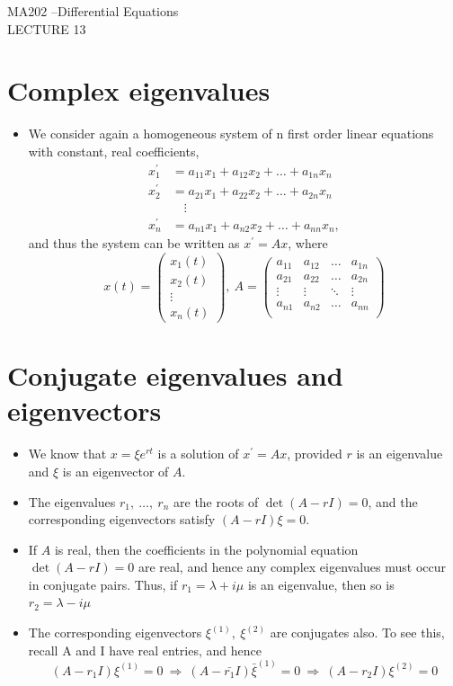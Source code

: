 \documentclass[11pt,a4paper]{article}
\begin{document}
	\begin{center}
		\vspace*{8cm}
		\Huge MA202 –Differential Equations\\
		\LARGE LECTURE 13
  \end{center}
  \newpage
	\section*{Complex eigenvalues}
	\begin{itemize}
		\item We consider again a homogeneous system of n first order linear equations with constant, real coefficients,
		\begin{align*}
			x_1^\prime &= a_{11}x_1 + a_{12}x_2 + \ldots + a_{1n}x_n\\
			x_2^\prime &= a_{21}x_1 + a_{22}x_2 + \ldots + a_{2n}x_n\\
			&\quad \vdots\\
			x_n^\prime &= a_{n1}x_1 + a_{n2}x_2 + \ldots + a_{nn}x_n,
		\end{align*}
		and thus the system can be written as $x^\prime = Ax$, where
		$$
		x(t) =
		\begin{pmatrix}
			x_1(t)\\
			x_2(t)\\
			\vdots\\
			x_n(t)
		\end{pmatrix},\ A =
		\begin{pmatrix}
			a_{11} & a_{12} & \ldots & a_{1n}\\
			a_{21} & a_{22} & \ldots & a_{2n}\\
			\vdots & \vdots & \ddots & \vdots\\
			a_{n1} & a_{n2} & \ldots & a_{nn}\\
		\end{pmatrix}
		$$
	\end{itemize}
	\section*{Conjugate eigenvalues and eigenvectors}
	\begin{itemize}
		\item We know that $x = \xi e^{rt}$ is a solution of $x^\prime = Ax$, provided $r$ is an eigenvalue and $\xi$ is an eigenvector of $A$.
		\item The eigenvalues $r_1,\ \ldots,\ r_n$ are the roots of $\det(A-rI) = 0$, and the corresponding eigenvectors satisfy $(A-rI)\xi = 0$.
		\item If $A$ is real, then the coefficients in the polynomial equation $\det(A-rI) = 0$ are real, and hence any complex eigenvalues must occur in conjugate pairs. Thus, if $r_1 = \lambda + i\mu$ is an eigenvalue, then so is $r_2 = \lambda - i\mu$
		\item The corresponding eigenvectors $\xi^{(1)},\ \xi^{(2)}$ are conjugates also. To see this, recall A and I have real entries, and hence
		$$
		(A-r_1I)\xi^{(1)} = 0\ \Rightarrow\ (A-\bar{r_1}I)\bar{\xi}^{(1)} = 0\ \Rightarrow\ (A-r_2I)\xi^{(2)}=0
		$$
	\end{itemize}
\end{document}
